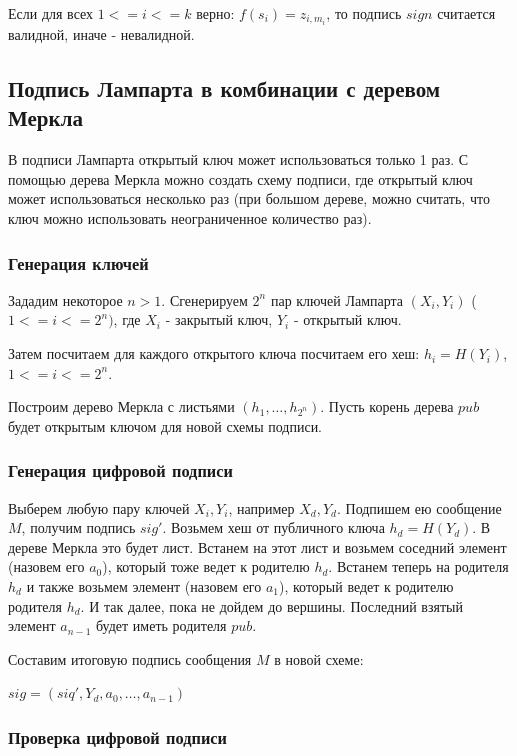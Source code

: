 \documentclass[colorthm]{./civarticle}
\begin{document}
Если для всех $1<=i<=k$ верно: $f(s_i) = z_{i, m_i}$, то подпись $sign$ считается валидной, иначе - невалидной.

\subsection{Подпись Лампарта в комбинации с деревом Меркла}

В подписи Лампарта открытый ключ может использоваться только 1 раз. С помощью дерева Меркла можно создать схему подписи, где открытый ключ может использоваться несколько раз (при большом дереве, можно считать, что ключ можно использовать неограниченное количество раз).

\subsubsection{Генерация ключей}

Зададим некоторое $n > 1$. Сгенерируем $2^n$ пар ключей Лампарта $(X_i, Y_i)$ ($1<=i<=2^n)$, где $X_i$ - закрытый ключ, $Y_i$ - открытый ключ.

Затем посчитаем для каждого открытого ключа посчитаем его хеш: $h_i = H(Y_i)$, $1<=i<=2^n$.

Построим дерево Меркла с листьями $(h_1, \ldots, h_{2^n})$. Пусть корень дерева $pub$ будет открытым ключом для новой схемы подписи.

\subsubsection{Генерация цифровой подписи}

Выберем любую пару ключей $X_i, Y_i$, например $X_d, Y_d$. Подпишем ею сообщение $M$, получим подпись $sig'$. Возьмем хеш от публичного ключа $h_d = H(Y_d)$. В дереве Меркла это будет лист. Встанем на этот лист и возьмем соседний элемент (назовем его $a_0$), который тоже ведет к родителю $h_d$. Встанем теперь на родителя $h_d$ и также возьмем элемент (назовем его $a_1$), который ведет к родителю родителя $h_d$. И так далее, пока не дойдем до вершины. Последний взятый элемент $a_{n-1}$ будет иметь родителя $pub$.

Составим итоговую подпись сообщения $M$ в новой схеме: 

$sig=(siq', Y_d, a_0, \ldots, a_{n-1})$

\subsubsection{Проверка цифровой подписи}
\end{document}
